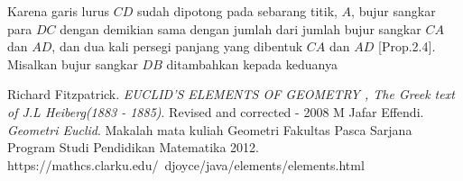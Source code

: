\documentclass[a4paper, 12pt]{book}
\begin{document}
Karena garis lurus $CD$ sudah dipotong pada sebarang titik, $A$, bujur sangkar para $DC$
dengan demikian sama dengan jumlah dari jumlah bujur sangkar $CA$ dan $AD$, dan dua kali
persegi panjang yang dibentuk $CA$ dan $AD$ [Prop.2.4]. Misalkan bujur  sangkar $DB$
ditambahkan kepada keduanya 
\begin{thebibliography}{9}
Richard Fitzpatrick.
\textit{EUCLID’S ELEMENTS OF GEOMETRY , The Greek text of J.L Heiberg(1883 - 1885)}.
Revised and corrected - 2008 
M Jafar Effendi.
\textit{Geometri Euclid}.
Makalah mata kuliah Geometri Fakultas Pasca Sarjana Program Studi Pendidikan Matematika 2012.
https://mathcs.clarku.edu/~djoyce/java/elements/elements.html 
\end{thebibliography}
\end{document}

